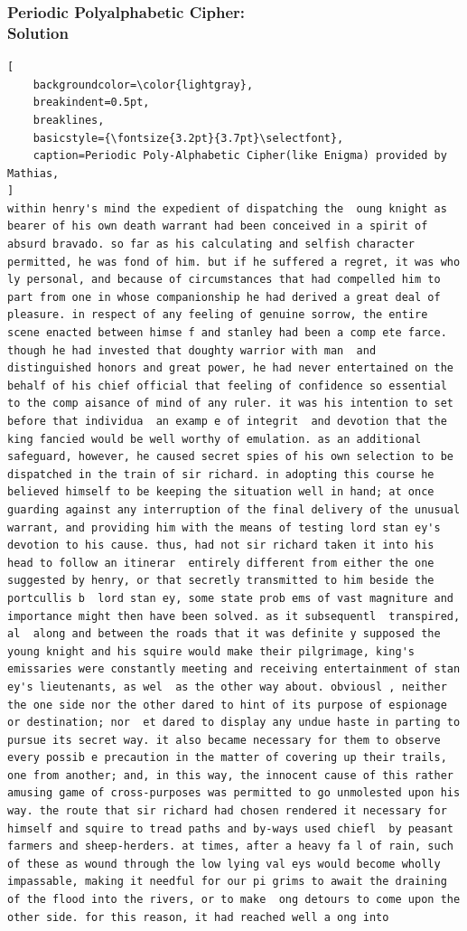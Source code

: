 \documentclass{uva-inf-presentation}
\begin{document}
\begin{frame}[containsverbatim]
\frametitle{Periodic Polyalphabetic Cipher:\\ Solution}
\vspace{-20pt}
\begin{lstlisting}[
    backgroundcolor=\color{lightgray},
    breakindent=0.5pt,
    breaklines,
    basicstyle={\fontsize{3.2pt}{3.7pt}\selectfont},
    caption=Periodic Poly-Alphabetic Cipher(like Enigma) provided by Mathias,
]
within henry's mind the expedient of dispatching the  oung knight as bearer of his own death warrant had been conceived in a spirit of absurd bravado. so far as his calculating and selfish character permitted, he was fond of him. but if he suffered a regret, it was who ly personal, and because of circumstances that had compelled him to part from one in whose companionship he had derived a great deal of pleasure. in respect of any feeling of genuine sorrow, the entire scene enacted between himse f and stanley had been a comp ete farce. though he had invested that doughty warrior with man  and distinguished honors and great power, he had never entertained on the behalf of his chief official that feeling of confidence so essential to the comp aisance of mind of any ruler. it was his intention to set before that individua  an examp e of integrit  and devotion that the king fancied would be well worthy of emulation. as an additional safeguard, however, he caused secret spies of his own selection to be dispatched in the train of sir richard. in adopting this course he believed himself to be keeping the situation well in hand; at once guarding against any interruption of the final delivery of the unusual warrant, and providing him with the means of testing lord stan ey's devotion to his cause. thus, had not sir richard taken it into his head to follow an itinerar  entirely different from either the one suggested by henry, or that secretly transmitted to him beside the portcullis b  lord stan ey, some state prob ems of vast magniture and importance might then have been solved. as it subsequentl  transpired, al  along and between the roads that it was definite y supposed the young knight and his squire would make their pilgrimage, king's emissaries were constantly meeting and receiving entertainment of stan ey's lieutenants, as wel  as the other way about. obviousl , neither the one side nor the other dared to hint of its purpose of espionage or destination; nor  et dared to display any undue haste in parting to pursue its secret way. it also became necessary for them to observe every possib e precaution in the matter of covering up their trails, one from another; and, in this way, the innocent cause of this rather amusing game of cross-purposes was permitted to go unmolested upon his way. the route that sir richard had chosen rendered it necessary for himself and squire to tread paths and by-ways used chiefl  by peasant farmers and sheep-herders. at times, after a heavy fa l of rain, such of these as wound through the low lying val eys would become wholly impassable, making it needful for our pi grims to await the draining of the flood into the rivers, or to make  ong detours to come upon the other side. for this reason, it had reached well a ong into 
\end{lstlisting}
\end{frame}
\end{document}
